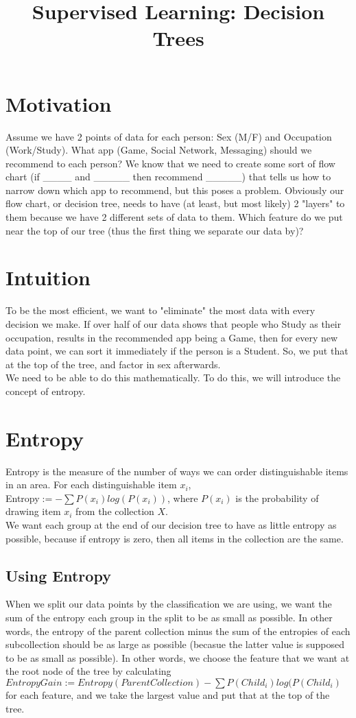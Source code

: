 \documentclass{article}
\title{Supervised Learning: Decision Trees}
\begin{document}
\maketitle
\section{Motivation}
Assume we have 2 points of data for each person: Sex (M/F) and Occupation (Work/Study). What app (Game, Social Network, Messaging) should we recommend to each person? We know that we need to create some sort of flow chart (if \_\_\_\_ and  \_\_\_\_\_ then recommend \_\_\_\_\_) that tells us how to narrow down which app to recommend, but this poses a problem. Obviously our flow chart, or decision tree, needs to have (at least, but most likely) 2 "layers" to them because we have 2 different sets of data to them. Which feature do we put near the top of our tree (thus the first thing we separate our data by)?

\section{Intuition}
To be the most efficient, we want to "eliminate" the most data with every decision we make. If over half of our data shows that people who Study as their occupation, results in the recommended app being a Game, then for every new data point, we can sort it immediately if the person is a Student. So, we put that at the top of the tree, and factor in sex afterwards.\\We need to be able to do this mathematically. To do this, we will introduce the concept of entropy.

\section{Entropy}
Entropy is the measure of the number of ways we can order distinguishable items in an area. For each distinguishable item $x_i$,\\
Entropy$ := -\sum P(x_i)log(P(x_i))$, where $P(x_i)$ is the probability of drawing item $x_i$ from the collection $X$.\\
We want each group at the end of our decision tree to have as little entropy as possible, because if entropy is zero, then all items in the collection are the same.
\subsection{Using Entropy}
When we split our data points by the classification we are using, we want the sum of the entropy each group in the split to be as small as possible. In other words, the entropy of the parent collection minus the sum of the entropies of each subcollection should be as large as possible (becasue the latter value is supposed to be as small as possible). In other words, we choose the feature that we want at the root node of the tree by calculating \\
$Entropy Gain := Entropy(Parent Collection) - \sum P(Child_i)log(P(Child_i)$\\
for each feature, and we take the largest value and put that at the top of the tree.
\end{document}
